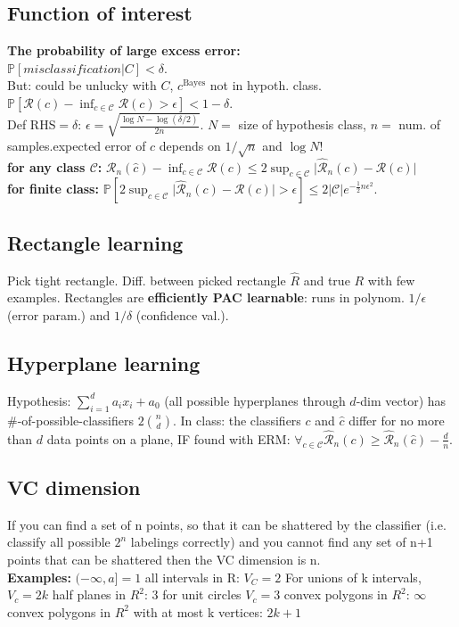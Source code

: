 \subsection*{Function of interest}
\textbf{The probability of large excess error:}\\
$\mathbb{P}[misclassification|C]< \delta$.\\
But: could be unlucky with $C$, $c^\text{Bayes}$ not in hypoth. class.
$\mathbb{P}[\mathcal{R}(\hat{c})-\inf_{c\in\mathcal{C}}\mathcal{R}(c)>\epsilon]<1-\delta$.\\
Def RHS$=\delta$: $\epsilon=\sqrt{\frac{\log N - \log(\delta/2)}{2n}}$. 
$N =$ size of hypothesis class, $n =$ num. of samples.expected error of $c$ depends on $1/\sqrt{n}$ and $\log N$!\\
\textbf{for any class $\mathcal{C}$:} $\mathcal{R}_n(\hat{c})-\inf_{c\in\mathcal{C}}\mathcal{R}(c) \leq 2\sup_{c\in\mathcal{C}}\lvert \hat{\mathcal{R}}_n(c) - \mathcal{R}(c) \rvert$ \\
\textbf{for finite class:}
$\mathbb{P}[2\sup_{c\in\mathcal{C}}\lvert \hat{\mathcal{R}}_n(c) - \mathcal{R}(c) \rvert>\epsilon]\leq 2\lvert\mathcal{C}\rvert e^{-\frac{1}{2}n\epsilon^2}$.
\subsection*{Rectangle learning}
Pick tight rectangle. Diff. between picked rectangle $\hat{R}$ and true $R$ with few examples. Rectangles are \textbf{efficiently PAC learnable}: runs in polynom. $1/\epsilon$ (error param.) and $1/\delta$ (confidence val.).
\subsection*{Hyperplane learning}
Hypothesis: $\sum_{i=1}^d a_ix_i + a_0$ (all possible hyperplanes through $d$-dim vector) has \#-of-possible-classifiers $2\binom{n}{d}$. In class: the classifiers $c$ and $\hat{c}$ differ for no more than $d$ data points on a plane, IF found with ERM: $\forall_{c\in\mathcal{C}} \hat{\mathcal{R}}_n(c) \geq \hat{\mathcal{R}}_n(\hat{c}) - \frac{d}{n}$.
\subsection*{VC dimension}
If you can find a set of n points, so that it can be shattered by the classifier (i.e. classify all possible $2^n$ labelings correctly) and you cannot find any set of n+1
 points that can be shattered  then the VC dimension is n. \\
 \textbf{Examples:}
$(-\infty, a] =1$ 
all intervals in R: $V_C=2$
For unions of k intervals, $V_c=2k$
half planes in $R^2$: $3$
for unit circles $V_c=3$
convex polygons in $R^2$: $\infty$
convex polygons in $R^2$ with at most k vertices: $2k+1$


